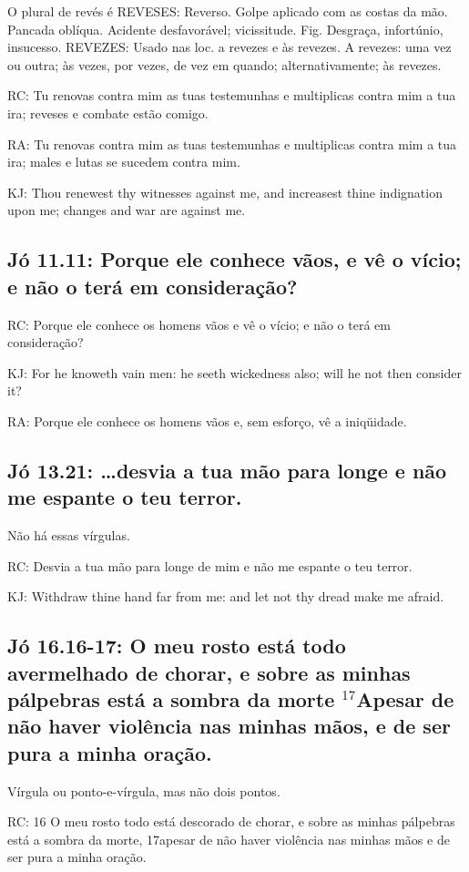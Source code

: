 O plural de revés é REVESES: Reverso. Golpe aplicado com as costas da mão. Pancada oblíqua. Acidente desfavorável; vicissitude. Fig.  Desgraça, infortúnio, insucesso. REVEZES: Usado nas loc. a revezes e às revezes. A revezes: uma vez ou outra; às vezes, por vezes, de vez em quando; alternativamente; às revezes.

RC: Tu renovas contra mim as tuas testemunhas e multiplicas contra mim a tua ira; reveses e combate estão comigo.

RA: Tu renovas contra mim as tuas testemunhas e multiplicas contra mim a tua ira; males e lutas se sucedem contra mim.

KJ: Thou renewest thy witnesses against me, and increasest thine indignation upon me; changes and war are against me.

\subsection{Jó 11.11: Porque ele conhece  vãos, e vê o vício; e não o terá em consideração?}

RC: Porque ele conhece os homens vãos e vê o vício; e não o terá em consideração?

KJ:  For he knoweth vain men: he seeth wickedness also; will he not then consider it?

RA: Porque ele conhece os homens vãos e, sem esforço, vê a iniqüidade.

\subsection{Jó 13.21: \ldots desvia a tua mão para longe e não me espante o teu terror.}
Não há essas vírgulas.

RC: Desvia a tua mão para longe de mim e não me espante o teu terror.

KJ: Withdraw thine hand far from me: and let not thy dread make me afraid.

\subsection{Jó 16.16-17: O meu rosto está todo avermelhado de chorar, e sobre as minhas pálpebras está a sombra da morte\uwave{:} $^{\mathrm{17}}$Apesar de não haver violência nas minhas mãos, e de ser pura a minha oração.}
Vírgula ou ponto-e-vírgula, mas não dois pontos.

RC: 16 O meu rosto todo está descorado de chorar, e sobre as minhas pálpebras está a sombra da morte, 17apesar de não haver violência nas minhas mãos e de ser pura a minha oração.

